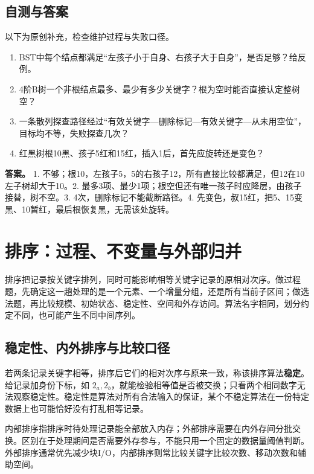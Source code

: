 \section{自测与答案}\label{ds-ch7-check}

以下为原创补充，检查维护过程与失败口径。

\begin{enumerate}
\def\labelenumi{\arabic{enumi}.}
\tightlist
\item
  BST中每个结点都满足``左孩子小于自身、右孩子大于自身''，是否足够？给反例。
\item
  4阶B树一个非根结点最多、最少有多少关键字？根为空时能否直接认定整树空？
\item
  一条散列探查路径经过``有效关键字---删除标记---有效关键字---从未用空位''，目标均不等，失败探查几次？
\item
  红黑树根10黑、孩子5红和15红，插入1后，首先应旋转还是变色？
\end{enumerate}

\textbf{答案。} 1. 不够；根10，左孩子5，5的右孩子12，所有直接比较都满足，但12在10左子树却大于10。2. 最多3项、最少1项；根空但还有唯一孩子时应降层，由孩子接替，树不空。3. 4次，删除标记不能截断路径。4. 先变色，叔15红，把5、15变黑、10暂红，最后根恢复黑，无需该处旋转。

\chapter{排序：过程、不变量与外部归并}\label{ds-ch8}

排序把记录按关键字排列，同时可能影响相等关键字记录的原相对次序。做过程题，先确定这一趟处理的是一个元素、一个增量分组，还是所有当前子区间；做选法题，再比较规模、初始状态、稳定性、空间和外存访问。算法名字相同，划分约定不同，也可能产生不同中间序列。

\section{稳定性、内外排序与比较口径}\label{ds-08-01}

若两条记录关键字相等，排序后它们的相对次序与原来一致，称该排序算法\textbf{稳定}。给记录加身份下标，如 \(2_a,2_b\)，就能检验相等值是否被交换；只看两个相同数字无法观察稳定性。稳定性是算法对所有合法输入的保证，某个不稳定算法在一份特定数据上也可能恰好没有打乱相等记录。

内部排序指排序时待处理记录能全部放入内存；外部排序需要在内外存间分批交换。区别在于处理期间是否需要外存参与，不能只用一个固定的数据量阈值判断。外部排序通常优先减少块I/O，内部排序则常比较关键字比较次数、移动次数和辅助空间。

